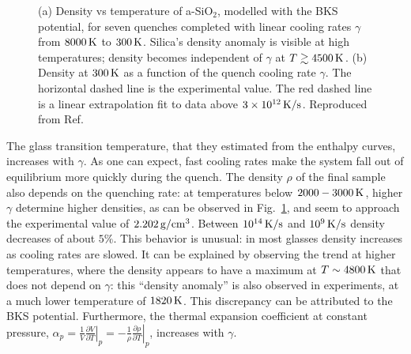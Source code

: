 \begin{figure}[!tb]
    \centering
    \hfill
    \caption{
    (a) Density vs temperature of a-SiO$_2$, modelled with the BKS potential, for seven quenches completed with linear cooling rates $\gamma$ from $8000\,\mathrm{K}$ to $300\,\mathrm{K}$. Silica's density anomaly is visible at high temperatures; density becomes independent of $\gamma$ at $T \gtrsim 4500\,\mathrm{K}$. 
    (b) Density at $300\,\mathrm{K}$ as a function of the quench cooling rate $\gamma$. The horizontal dashed line is the experimental value. The red dashed line is a linear extrapolation fit to data above $3\times 10^{12}\,\mathrm{K/s}$. 
    Reproduced from Ref.~\cite{Lane2015}}
    \label{fig:silica-bks-density}
\end{figure}
The glass transition temperature, that they estimated from the enthalpy curves, increases with $\gamma$. As one can expect, fast cooling rates make the system fall out of equilibrium more quickly during the quench. 
The density $\rho$ of the final sample also depends on the quenching rate: at temperatures below $2000-3000\,\mathrm{K}$, higher $\gamma$ determine higher densities, as can be observed in Fig.~\ref{fig:silica-bks-density}, and seem to approach the experimental value of $2.202\,\mathrm{g/cm^3}$. Between $10^{14}\,\mathrm{K/s}$ and $10^{9}\,\mathrm{K/s}$ density decreases of about $5\%$. 
This behavior is unusual: in most glasses density increases as cooling rates are slowed. It can be explained by observing the trend at higher temperatures, where the density appears to have a maximum at $T\sim 4800\,\mathrm{K}$ that does not depend on $\gamma$: this ``density anomaly'' is also observed in experiments, at a much lower temperature of $1820\,\mathrm{K}$. This discrepancy can be attributed to the BKS potential.
Furthermore, the thermal expansion coefficient at constant pressure, $\alpha_p = \frac{1}{V} \left.\frac{\partial V}{\partial T}\right|_p = -\frac{1}{\rho} \left.\frac{\partial \rho}{\partial T}\right|_p$, increases with $\gamma$.

